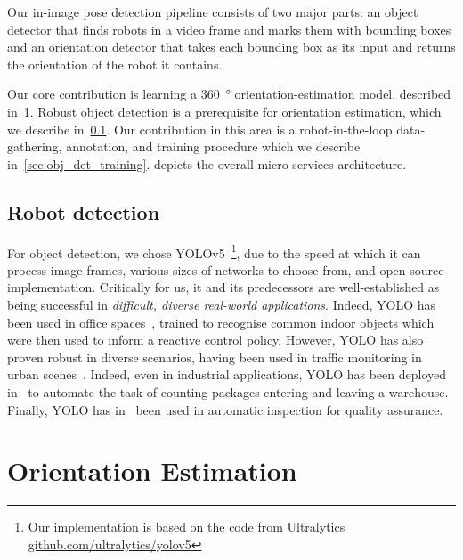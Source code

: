 \documentclass[conference]{ieeeconf}
\begin{document}
Our in-image pose detection pipeline consists of two major parts: an object detector that finds robots in a video frame and marks them with bounding boxes and an orientation detector that takes each bounding box as its input and returns the orientation of the robot it contains.

Our core contribution is learning a \SI{360}{\degree} orientation-estimation model, described in~\cref{sec:orientation}.
Robust object detection is a prerequisite for orientation estimation, which we describe in~\cref{sec:yolo}.
Our contribution in this area is a robot-in-the-loop data-gathering, annotation, and training procedure which we describe in~\cref{sec:obj_det_training}.
 depicts the overall micro-services architecture.

\subsection{Robot detection}
\label{sec:yolo}

For object detection, we chose YOLOv5~\cite{diwan2022object}\footnote{Our implementation is based on the code from Ultralytics \url{github.com/ultralytics/yolov5}}, due to the speed at which it can process image frames, various sizes of networks to choose from, and open-source implementation.
Critically for us, it and its predecessors are well-established as being successful in \textit{difficult, diverse real-world applications}.
% 
Indeed, YOLO has been used in office spaces~\cite{dos2019mobile}, trained to recognise common indoor objects which were then used to inform a reactive control policy.
%
However, YOLO has also proven robust in diverse scenarios, having been used in traffic monitoring in urban scenes~\cite{lin2018yolo}.
%
Indeed, even in industrial applications, YOLO has been deployed in~\cite{xie2022package} to automate the task of counting packages entering and leaving a warehouse.
%
Finally, YOLO has in~\cite{li2022two} been used in automatic inspection for quality assurance.


\section{Orientation Estimation}%
\label{sec:orientation}
\end{document}
